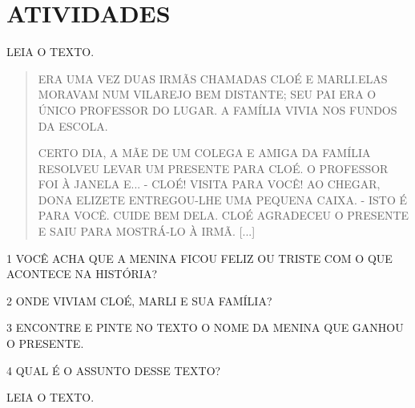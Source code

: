 
\section{ATIVIDADES}

LEIA O TEXTO.


\begin{quote}
ERA UMA VEZ DUAS IRMÃS CHAMADAS CLOÉ E MARLI.ELAS MORAVAM NUM VILAREJO
BEM DISTANTE; SEU PAI ERA O ÚNICO PROFESSOR DO LUGAR. A FAMÍLIA VIVIA
NOS FUNDOS DA ESCOLA.

CERTO DIA, A MÃE DE UM COLEGA E AMIGA DA FAMÍLIA RESOLVEU LEVAR UM
PRESENTE PARA CLOÉ. O PROFESSOR FOI À JANELA E... - CLOÉ! VISITA PARA
VOCÊ! AO CHEGAR, DONA ELIZETE ENTREGOU-LHE UMA PEQUENA CAIXA. - ISTO É
PARA VOCÊ. CUIDE BEM DELA. CLOÉ AGRADECEU O PRESENTE E SAIU PARA
MOSTRÁ-LO À IRMÃ. [...]

\end{quote}

\num{1} VOCÊ ACHA QUE A MENINA FICOU FELIZ OU TRISTE COM O QUE ACONTECE NA HISTÓRIA?


\num{2} ONDE VIVIAM CLOÉ, MARLI E SUA FAMÍLIA?


\num{3} ENCONTRE E PINTE NO TEXTO O NOME DA MENINA QUE GANHOU O PRESENTE.

\num{4} QUAL É O ASSUNTO DESSE TEXTO?


LEIA O TEXTO.

